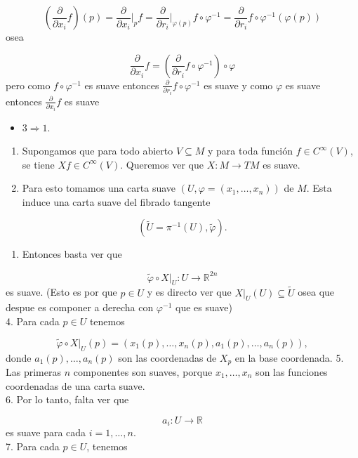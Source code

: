 \begin{bookproof}{}
\[
\left(\frac{\partial}{\partial x_{i}}f\right)(p)=\frac{\partial}{\partial x_{i}}\bigg|_{p}f=\frac{\partial}{\partial r_{i}}\bigg|_{\varphi(p)}f\circ\varphi ^{-1}=\frac{\partial}{\partial r_{i}} f\circ\varphi ^{-1}(\varphi(p))
\]
osea

\[
\frac{\partial}{\partial x_{i}}f =\left(\frac{\partial}{\partial r_{i}}f\circ\varphi ^{-1}\right)\circ\varphi
\]
pero como $f\circ\varphi ^{-1}$ es suave entonces $\frac{\partial}{\partial r_{i}}f\circ\varphi ^{-1}$ es suave y como $\varphi$ es suave entonces $\frac{\partial}{\partial x_{i}}f$ es suave

\begin{itemize}
\item $3 \Rightarrow 1$.
\end{itemize}
\begin{enumerate}
\item Supongamos que para todo abierto $V\subseteq M$ y para toda función $f\in C^\infty(V)$, se tiene $Xf\in C^\infty(V)$. Queremos ver que $X:M\to TM$ es suave.
\item Para esto tomamos una carta suave $(U,\varphi=(x_1,\ldots,x_n))$ de $M$. Esta induce una carta suave del fibrado tangente
\end{enumerate}
\[
(\widetilde U=\pi^{-1}(U),\widetilde\varphi).
\]
\begin{enumerate}[start=3]
\item Entonces basta ver que
\end{enumerate}
\[
\widetilde\varphi\circ X|_U:U\to\mathbb R^{2n}
\]
es suave. (Esto es por que $p\in U$ y es directo ver que $X|_{U}(U)\subseteq \tilde{U}$ osea que despue es componer a derecha con $\varphi ^{-1}$ que es suave)\\
4. Para cada $p\in U$ tenemos

\[
\widetilde\varphi\circ X|_U(p)=\left(x_1(p),\ldots,x_n(p),a_1(p),\ldots,a_n(p)\right),
\]
donde $a_1(p),\ldots,a_n(p)$ son las coordenadas de $X_p$ en la base coordenada. 5. Las primeras $n$ componentes son suaves, porque $x_1,\ldots,x_n$ son las funciones coordenadas de una carta suave.\\
6. Por lo tanto, falta ver que

\[
a_i:U\to\mathbb R
\]
es suave para cada $i=1,\ldots,n$.\\
7. Para cada $p\in U$, tenemos


\end{bookproof}
